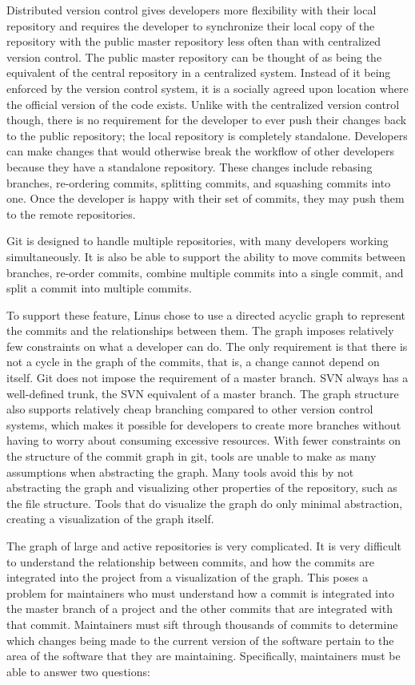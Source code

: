 Distributed version control gives developers more flexibility with their
local repository and requires the developer to synchronize their local
copy of the repository with the public master repository less often
than with centralized version control.
The public master repository can be thought of as being the equivalent
of the central repository in a centralized system.
Instead of it being enforced by the version control system,
it is a socially agreed upon location where the official version of the
code exists.
Unlike with the centralized version control though,
there is no requirement for the developer to ever push their changes
back to the public repository;
the local repository is completely standalone.
Developers can make changes that would otherwise break the workflow of
other developers because they have a standalone repository.
These changes include rebasing branches, re-ordering commits,
splitting commits, and squashing commits into one.
Once the developer is happy with their set of commits, they may push
them to the remote repositories.

Git is designed to handle multiple repositories, with many
developers working simultaneously.
It is also be able to support the ability to move commits between
branches, re-order commits, combine multiple commits into a single
commit, and split a commit into multiple commits.

To support these feature, Linus chose to use a directed acyclic
graph to represent the commits and the relationships between them.
The graph imposes relatively few constraints on what a developer can do.
The only requirement is that there is not a cycle in the graph of the commits,
that is, a change cannot depend on itself.
Git does not impose the requirement of a master branch.
SVN always has a well-defined trunk, the SVN equivalent of a master
branch.
The graph structure also supports relatively cheap branching compared to
other version control systems, which makes it possible for developers to
create more branches without having to worry about consuming excessive
resources.
With fewer constraints on the structure of the commit graph in git,
tools are unable to make as many assumptions when abstracting the graph.
Many tools avoid this by not abstracting the graph and visualizing other
properties of the repository, such as the file structure.
Tools that do visualize the graph do only minimal abstraction, creating
a visualization of the graph itself.

The graph of large and active repositories is very complicated.
It is very difficult to understand the relationship between commits, and
how the commits are integrated into the project from a visualization of
the graph.
This poses a problem for maintainers who must understand how a
commit is integrated into the master branch of a
project and the other commits that are integrated with that commit.
Maintainers must sift through thousands of commits to determine which
changes being made to the current version of the software pertain to
the area of the software that they are maintaining.
Specifically, maintainers must be able to answer two questions:

